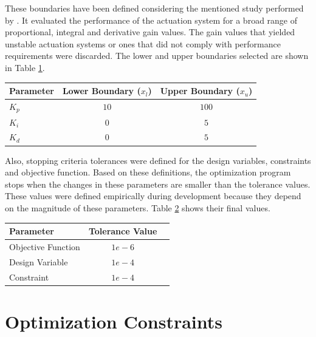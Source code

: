 These boundaries have been defined considering the mentioned study performed by . It evaluated the performance of the actuation system for a broad range of proportional, integral and derivative gain values. The gain values that yielded unstable actuation systems or ones that did not comply with performance requirements were discarded. The lower and upper boundaries selected are shown in Table \ref{table:4_2_ControllerGainBoundaries}.

\begin{table}[H]
	\label{table:4_2_ControllerGainBoundaries}
	\centering
	\resizebox{8cm}{!} {
		\begin{tabular}{|l|c|c|}
			\hline
			Parameter & Lower Boundary ($x_l$)  & Upper Boundary ($x_u$)\\ \hline
			$K_p$ 	  & $10$  		   			& $100$ 				\\ \hline
			$K_i$ 	  & $0$  		   			& $5$ 					\\ \hline
			$K_d$ 	  & $0$  		   			& $5$	 				\\ \hline
	\end{tabular}}
\end{table}

Also, stopping criteria tolerances were defined for the design variables, constraints and objective function. Based on these definitions, the optimization program stops when the changes in these parameters are smaller than the tolerance values.  These values were defined empirically during development because they depend on the magnitude of these parameters. Table \ref{table:4_2_StoppingCriteriaParam} shows their final values.

\begin{table}[H]
	\label{table:4_2_StoppingCriteriaParam}
	\centering
	\resizebox{6cm}{!} {
		\begin{tabular}{|l|c|c|}
			\hline
			Parameter 			  & Tolerance Value \\ \hline
			Objective Function 	  & $1e-6$	  \\ \hline
			Design Variable 	  & $1e-4$	  \\ \hline
			Constraint		  	  & $1e-4$	  \\ \hline
	\end{tabular}}
\end{table}

\section{Optimization Constraints} \label{4-3-ConstraintFunction}

